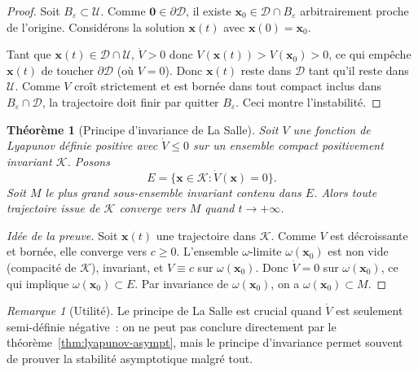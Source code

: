 \documentclass[12pt,a4paper,openany]{book}
\theoremstyle{definition}
\theoremstyle{plain}
\newtheorem{theoreme}[definition]{Théorème}
\theoremstyle{remark}
\newtheorem{remarque}[definition]{Remarque}
\begin{document}
\begin{proof}
  Soit $B_\varepsilon\subset\mathcal{U}$. Comme
  $\mathbf{0}\in\partial\mathcal{D}$, il existe
  $\mathbf{x}_0\in\mathcal{D}\cap B_\varepsilon$ arbitrairement
  proche de l'origine. Considérons la solution $\mathbf{x}(t)$ avec
  $\mathbf{x}(0)=\mathbf{x}_0$.

  Tant que $\mathbf{x}(t)\in\mathcal{D}\cap\mathcal{U}$,
  $\dot{V}>0$ donc $V(\mathbf{x}(t))>V(\mathbf{x}_0)>0$, ce qui
  empêche $\mathbf{x}(t)$ de toucher $\partial\mathcal{D}$ (où $V=0$).
  Donc $\mathbf{x}(t)$ reste dans $\mathcal{D}$ tant qu'il reste
  dans $\mathcal{U}$. Comme $V$ croît strictement et est bornée dans
  tout compact inclus dans $B_\varepsilon\cap\mathcal{D}$, la
  trajectoire doit finir par quitter $B_\varepsilon$. Ceci montre
  l'instabilité.
\end{proof}

\begin{theoreme}[Principe d'invariance de La Salle]\label{thm:lasalle}
  Soit $V$ une fonction de Lyapunov définie positive avec $\dot{V}\leq 0$
  sur un ensemble compact positivement invariant $\mathcal{K}$. Posons
  \[
    E = \{\mathbf{x}\in\mathcal{K}:\dot{V}(\mathbf{x})=0\}.
  \]
  Soit $M$ le plus grand sous-ensemble invariant contenu dans $E$.
  Alors toute trajectoire issue de $\mathcal{K}$ converge vers $M$
  quand $t\to+\infty$.
\end{theoreme}

\begin{proof}[Idée de la preuve]
  Soit $\mathbf{x}(t)$ une trajectoire dans $\mathcal{K}$.
  Comme $V$ est décroissante et bornée, elle converge vers $c\geq 0$.
  L'ensemble $\omega$-limite
  $\omega(\mathbf{x}_0)$ est non vide (compacité de $\mathcal{K}$),
  invariant, et $V\equiv c$ sur $\omega(\mathbf{x}_0)$. Donc
  $\dot{V}=0$ sur $\omega(\mathbf{x}_0)$, ce qui implique
  $\omega(\mathbf{x}_0)\subset E$. Par invariance de
  $\omega(\mathbf{x}_0)$, on a $\omega(\mathbf{x}_0)\subset M$.
\end{proof}

\begin{remarque}[Utilité]\label{rem:lasalle-utilite}
  Le principe de La Salle est crucial quand $\dot{V}$ est seulement
  semi-définie négative~: on ne peut pas conclure directement par le
  théorème~\ref{thm:lyapunov-asympt}, mais le principe d'invariance
  permet souvent de prouver la stabilité asymptotique malgré tout.
\end{remarque}
\end{document}
